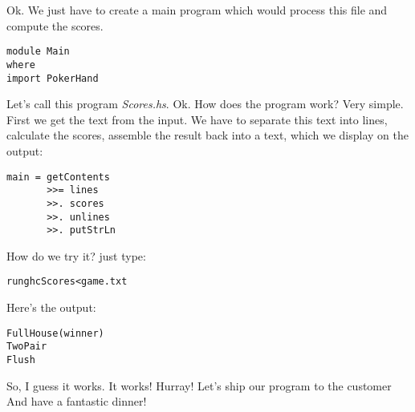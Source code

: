 \lhA Ok. We just have to create a main program which would process this file and compute the scores.

\begin{lstlisting}[frame=single] 
module Main
where
import PokerHand
\end{lstlisting}
Let's call this program \emph{Scores.hs}.
\lhN Ok. How does the program work?
\lhA Very simple. First we get the text from the input. We have to separate this text into lines, calculate the scores, assemble the result back into a text, which we display on the output: 
\begin{lstlisting}[frame=single]
main = getContents 
       >>= lines
       >>. scores
       >>. unlines
       >>. putStrLn
\end{lstlisting}
\lhN How do we try it?
\lhA just type:
\begin{alltt}
runghc Scores <game.txt
\end{alltt}
\lhN Here's the output:
\begin{alltt}
       Full House (winner)
       Two Pair
      
  
       Flush
     
\end{alltt}
So, I guess it works.
\lhA \success \success \success It works! Hurray!
\lhN Let's ship our program to the customer
\lhA And have a fantastic dinner!
\lhend
